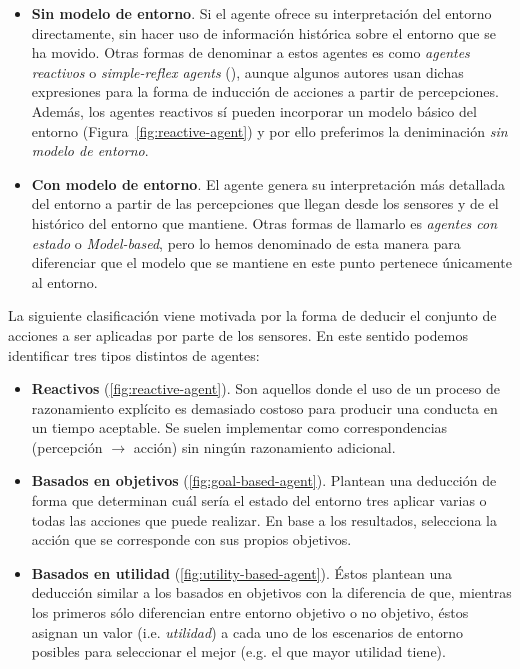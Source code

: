 \begin{itemize}
	\item \textbf{Sin modelo de entorno}. Si el agente ofrece su interpretación del entorno directamente, sin hacer uso de información histórica sobre el entorno que se ha movido. Otras formas de denominar a estos agentes es como \textit{agentes reactivos} o \textit{simple-reflex agents} (\cite{russell2003artificial}), aunque algunos autores usan dichas expresiones para la forma de inducción de acciones a partir de percepciones. Además, los agentes reactivos sí pueden incorporar un modelo básico del entorno (Figura~\ref{fig:reactive-agent}) y por ello preferimos la deniminación \textit{sin modelo de entorno}.
	\item \textbf{Con modelo de entorno}. El agente genera su interpretación más detallada del entorno a partir de las percepciones que llegan desde los sensores y de el histórico del entorno que mantiene. Otras formas de llamarlo es \textit{agentes con estado} o \textit{Model-based}, pero lo hemos denominado de esta manera para diferenciar que el modelo que se mantiene en este punto pertenece únicamente al entorno.
\end{itemize}

La siguiente clasificación viene motivada por la forma de deducir el conjunto de acciones a ser aplicadas por parte de los sensores. En este sentido podemos identificar tres tipos distintos de agentes:

\begin{itemize}
	\item \textbf{Reactivos} (\ref{fig:reactive-agent}). Son aquellos donde el uso de un proceso de razonamiento explícito es demasiado costoso para producir una conducta en un tiempo aceptable. Se suelen implementar como correspondencias (percepción $\rightarrow$ acción) sin ningún razonamiento adicional.
	\item \textbf{Basados en objetivos} (\ref{fig:goal-based-agent}). Plantean una deducción de forma que determinan cuál sería el estado del entorno tres aplicar varias o todas las acciones que puede realizar. En base a los resultados, selecciona la acción que se corresponde con sus propios objetivos.
	\item \textbf{Basados en utilidad} (\ref{fig:utility-based-agent}). Éstos plantean una deducción similar a los basados en objetivos con la diferencia de que, mientras los primeros sólo diferencian entre entorno objetivo o no objetivo, éstos asignan un valor (i.e. \textit{utilidad}) a cada uno de los escenarios de entorno posibles para seleccionar el mejor (e.g. el que mayor utilidad tiene).
\end{itemize}

